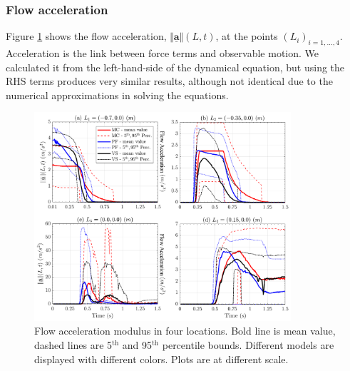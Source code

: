 \documentclass{article}
\begin{document}
\subsubsection{Flow acceleration}
Figure \ref{fig:Ramp-AccL} shows the flow acceleration, $\Vert \underline{\mathbf{a}} \Vert(L,t)$, at the points $(L_i)_{i=1,\dots,4}$. Acceleration is the link between force terms and observable motion. We calculated it from the left-hand-side of the dynamical equation, but using the RHS terms produces very similar results, although not identical due to the numerical approximations in solving the equations.
\begin{figure}[H]
         \centering
        \includegraphics[width=0.85\textwidth]{InclinedPlane/LocalMeasurments/Acceleration.png}
        \caption{Flow acceleration modulus in four locations. Bold line is mean value, dashed lines are 5$^{\mathrm{th}}$ and 95$^{\mathrm{th}}$ percentile bounds. Different models are displayed with different colors. Plots are at different scale.}
        \label{fig:Ramp-AccL}
\end{figure}
\end{document}
